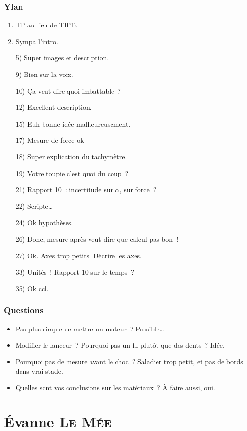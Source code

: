 \documentclass[a4paper, 11pt, final, garamond]{book}
\begin{document}
\subsection{Ylan}
\begin{enumerate}
  \item TP au lieu de TIPE.
  \item Sympa l'intro.
  \item [5)] Super images et description.
  \item [9)] Bien sur la voix.
  \item [10)] Ça veut dire quoi imbattable~?
  \item [12)] Excellent description.
  \item [15)] Euh bonne idée malheureusement.
  \item [17)] Mesure de force ok
  \item [18)] Super explication du tachymètre.
  \item [19)] Votre toupie c'est quoi du coup~?
  \item [21)] Rapport 10~: incertitude sur $\alpha$, sur force~?
  \item [22)] Scripte…
  \item [24)] Ok hypothèses.
  \item [26)] Donc, mesure après veut dire que calcul pas bon~!
  \item [27)] Ok. Axes trop petits. Décrire les axes.
  \item[33)] Unités~! Rapport 10 sur le temps~?
  \item[35)] Ok ccl.
\end{enumerate}

\subsection{Questions}
\begin{itemize}
  \item Pas plus simple de mettre un moteur~? Possible…
  \item Modifier le lanceur~? Pourquoi pas un fil plutôt que des dents~? Idée.
  \item Pourquoi pas de mesure avant le choc~? Saladier trop petit, et pas de
    bords dans vrai stade.
  \item Quelles sont vos conclusions sur les matériaux~? À faire aussi, oui.
\end{itemize}

\chapter{Évanne \textsc{Le Mée}}
\label{ch:evanne}
\end{document}
